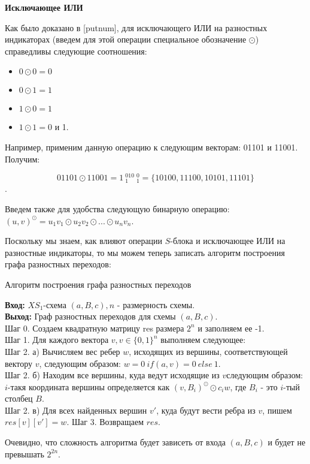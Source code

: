 \documentclass[a4paper,12pt]{extarticle}
\begin{document}
\begin{large}
\textbf{Исключающее ИЛИ}

 Как было доказано в [putnum], для исключающего ИЛИ на разностных индикаторах (введем для этой операции специальное обозначение $\odot$) справедливы следующие соотношения:

\begin{itemize}
\item $0 \odot 0 = 0$
\item $0 \odot 1 = 1$
\item $1 \odot 0= 1$
\item $1 \odot 1 = 0$ и 1. 
\end{itemize}

Например, применим данную операцию к следующим векторам: 01101 и 11001. Получим:

$$01101 \odot 11001 = 1~_{1}^010~_{1}^0 = \{10100, 11100, 10101, 11101\}$$.

Введем также для удобства следующую бинарную операцию: $(u, v)^{\odot} = u_1v_1 \odot u_2v_2 \odot ... \odot u_nv_n$.

Поскольку мы знаем, как влияют операции $S$-блока и исключающее ИЛИ на разностные индикаторы, то мы можем теперь записать алгоритм построения графа разностных переходов:

\begin{algorithm}[H]
\caption{Алгоритм построения графа разностных переходов}
\label{diff_graph_construct}
\textbf{Вход:} $XS_1$-схема $(a, B, c), n$ - размерность схемы.\\
\textbf{Выход:} Граф разностных переходов для схемы $(a, B, c)$.\\
Шаг 0. Создаем квадратную матрицу res размера $2^n$ и заполняем ее -1. \\
Шаг 1. Для каждого вектора $v, v \in \{0, 1\}^n$ выполняем следующее: \\
Шаг 2. а) Вычисляем вес ребер $w$, исходящих из вершины, соответствующей вектору $v$, следующим образом: $w = 0~ if (a,v) = 0 ~else ~1$.\\
Шаг 2. б) Находим все вершины, куда ведут исходящие из $v$следующим образом: $i$-такя координата вершины определяется как $(v, B_i)^{\odot} \odot c_iw$, где $B_i$ - это $i$-тый столбец $B$. \\
Шаг 2. в) Для всех найденных вершин $v'$, куда будут вести ребра из $v$, пишем $res[v][v'] = w$.
Шаг 3. Возвращаем $res$.\\
\end{algorithm}

Очевидно, что сложность алгоритма будет зависеть от входа $(a,B,c)$ и будет не превышать $2^{2n}$.


\end{large}
\end{document}
